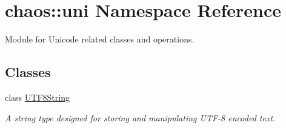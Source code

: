 \hypertarget{namespacechaos_1_1uni}{\section{chaos\-:\-:uni Namespace Reference}
\label{namespacechaos_1_1uni}
}


Module for Unicode related classes and operations.  


\subsection*{Classes}
\begin{DoxyCompactItemize}
\item 
class \hyperlink{classchaos_1_1uni_1_1_u_t_f8_string}{U\-T\-F8\-String}
\begin{DoxyCompactList}\small\item\em A string type designed for storing and manipulating U\-T\-F-\/8 encoded text. \end{DoxyCompactList}\end{DoxyCompactItemize}
